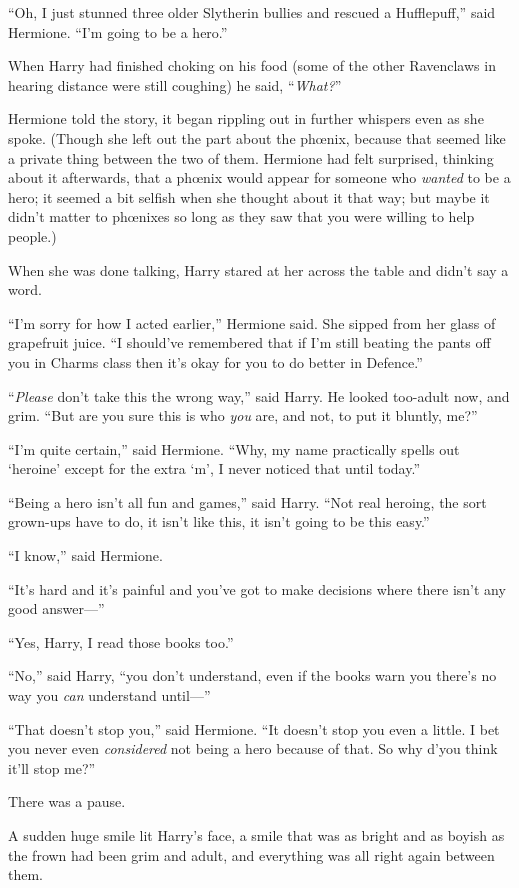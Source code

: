 “Oh, I just stunned three older Slytherin bullies and rescued a Hufflepuff,” said Hermione. “I’m going to be a hero.”

When Harry had finished choking on his food (some of the other Ravenclaws in hearing distance were still coughing) he said, “\emph{What?}”

Hermione told the story, it began rippling out in further whispers even as she spoke. (Though she left out the part about the phœnix, because that seemed like a private thing between the two of them. Hermione had felt surprised, thinking about it afterwards, that a phœnix would appear for someone who \emph{wanted} to be a hero; it seemed a bit selfish when she thought about it that way; but maybe it didn’t matter to phœnixes so long as they saw that you were willing to help people.)

When she was done talking, Harry stared at her across the table and didn’t say a word.

“I’m sorry for how I acted earlier,” Hermione said. She sipped from her glass of grapefruit juice. “I should’ve remembered that if I’m still beating the pants off you in Charms class then it’s okay for you to do better in Defence.”

“\emph{Please} don’t take this the wrong way,” said Harry. He looked too-adult now, and grim. “But are you sure this is who \emph{you} are, and not, to put it bluntly, me?”

“I’m quite certain,” said Hermione. “Why, my name practically spells out ‘heroine’ except for the extra ‘m’, I never noticed that until today.”

“Being a hero isn’t all fun and games,” said Harry. “Not real heroing, the sort grown-ups have to do, it isn’t like this, it isn’t going to be this easy.”

“I know,” said Hermione.

“It’s hard and it’s painful and you’ve got to make decisions where there isn’t any good answer—”

“Yes, Harry, I read those books too.”

“No,” said Harry, “you don’t understand, even if the books warn you there’s no way you \emph{can} understand until—”

“That doesn’t stop you,” said Hermione. “It doesn’t stop you even a little. I bet you never even \emph{considered} not being a hero because of that. So why d’you think it’ll stop me?”

There was a pause.

A sudden huge smile lit Harry’s face, a smile that was as bright and as boyish as the frown had been grim and adult, and everything was all right again between them.

